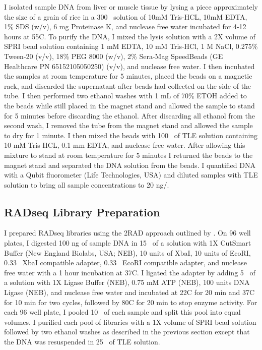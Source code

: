 I isolated sample DNA from liver or muscle tissue by lysing a piece approximately 
the size of a grain of rice in a 300 \uL\ solution of 10mM Tris-HCL, 10mM EDTA, 
1\% SDS (w/v), 6 mg Proteinase K, and nuclease free water incubated for 4-12 
hours at 55\degree C.  
To purify the DNA, I mixed the lysis solution with a 2X volume of SPRI bead 
solution containing 1 mM EDTA, 10 mM Tris-HCl, 1 M NaCl, 0.275\% Tween-20 (v/v), 18\% PEG 8000 (w/v), 
2\% Sera-Mag SpeedBeads (GE Healthcare PN 65152105050250) (v/v), and nuclease free water.
I then incubated the samples at room temperature for 5 minutes, placed the 
beads on a magnetic rack, and discarded the supernatant after beads had collected
on the side of the tube.  
I then performed two ethanol washes with 1 mL of 70\% ETOH added to the beads
while still placed in the magnet stand and allowed the sample to stand for 5 minutes
before discarding the ethanol. 
After discarding all ethanol from the second wash, I removed the tube from the magnet 
stand and allowed the sample to dry for 1 minute.
I then mixed the beads with 100 \uL\ of TLE solution containing 10 mM Tris-HCL, 
0.1 mm EDTA, and nuclease free water.
After allowing this mixture to stand at room temperature for 5 minutes I returned
the beads to the magnet stand and separated the DNA solution from the beads.
I quantified DNA with a Qubit fluorometer (Life Technologies, USA) and diluted 
samples with TLE solution to bring all sample concentrations to 20 ng/\uL.

\subsection{RADseq Library Preparation}
I prepared RADseq libraries using the 2RAD approach outlined by \cite{bayona-vasquez2019}. 
On 96 well plates, I digested 100 ng of sample DNA in 15 \uL\ of a solution with 
1X CutSmart Buffer (New England Biolabs, USA; NEB), 10 units of XbaI,
10 units of EcoRI, 0.33 \uM\ XbaI compatible adapter, 0.33 \uM\ EcoRI compatible adapter,
and nuclease free water with a 1 hour incubation at 37\degree C. 
I ligated the adapter by adding 5 \uL\ of a solution with 1X Ligase Buffer (NEB),
0.75 mM ATP (NEB), 100 units DNA Ligase (NEB), and nuclease free water 
and incubated at 22\degree C for 20 min and 37\degree C for 10 min for two cycles, 
followed by 80\degree C for 20 min to stop enzyme activity.
For each 96 well plate, I pooled 10 \uL\ of each sample and split this pool 
into equal volumes.
I purified each pool of libraries with a 1X volume of SPRI bead solution followed 
by two ethanol washes as described in the previous section except that the DNA 
was resuspended in 25 \uL\ of TLE solution. 

